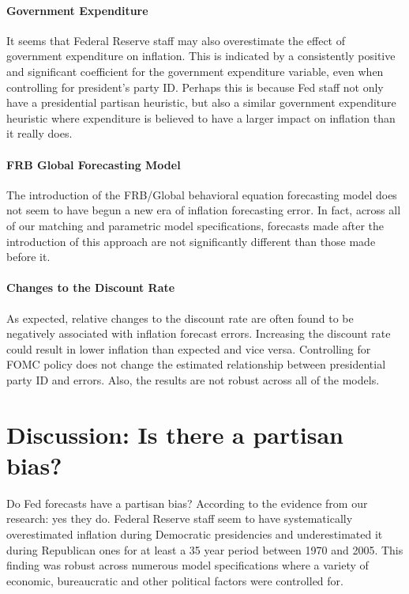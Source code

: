 \documentclass[a4paper]{article}\usepackage{graphicx, color}
\begin{document}
\paragraph{Government Expenditure}

It seems that Federal Reserve staff may also overestimate the effect of government expenditure on inflation. This is indicated by a consistently positive and significant coefficient for the government expenditure variable, even when controlling for president's party ID. Perhaps this is because Fed staff not only have a presidential partisan heuristic, but also a similar government expenditure heuristic where expenditure is believed to have a larger impact on inflation than it really does.

\paragraph{FRB Global Forecasting Model}

The introduction of the FRB/Global behavioral equation forecasting model does not seem to have begun a new era of inflation forecasting error. In fact, across all of our matching and parametric model specifications, forecasts made after the introduction of this approach are not significantly different than those made before it. 

\paragraph{Changes to the Discount Rate}

As expected, relative changes to the discount rate are often found to be negatively associated with inflation forecast errors. Increasing the discount rate could result in lower inflation than expected and vice versa. Controlling for FOMC policy does not change the estimated relationship between presidential party ID and errors. Also, the results are not robust across all of the models. 

\section*{Discussion: Is there a partisan bias?}

Do Fed forecasts have a partisan bias? According to the evidence from our research: yes they do. Federal Reserve staff seem to have systematically overestimated inflation during Democratic presidencies and underestimated it during Republican ones for at least a 35 year period between 1970 and 2005. This finding was robust across numerous model specifications where a variety of economic, bureaucratic and other political factors were controlled for. 
\end{document}
